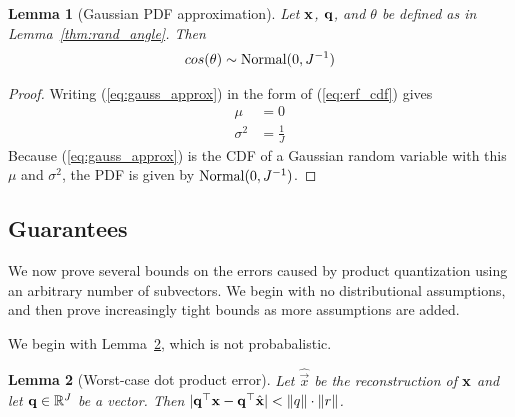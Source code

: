 \documentclass[]{article}
\newtheorem{lemma}{Lemma}[section]
\newtheorem{corollary}{Corrolary}[section]
\begin{document}
\begin{lemma}[Gaussian PDF approximation] \label{thm:gauss_pdf}
Let $\mathbf{x}$, $\mathbf{q}$, and $\theta$ be defined as in Lemma~\ref{thm:rand_angle}. Then
\begin{align} \label{eq:normal_approx_pdf}
    cos(\theta) \sim \operatorname{Normal}(0, J^{-1})
\end{align}
\end{lemma}

\begin{proof} Writing (\ref{eq:gauss_approx}) in the form of (\ref{eq:erf_cdf}) gives
\begin{align}
    \mu &= 0 \\
    \sigma^2 &= \frac{1}{J}
\end{align}
Because (\ref{eq:gauss_approx}) is the CDF of a Gaussian random variable with this $\mu$ and $\sigma^2$, the PDF is given by $\operatorname{Normal}(0, J^{-1})$.
\end{proof}


\subsection{Guarantees}%

We now prove several bounds on the errors caused by product quantization using an arbitrary number of subvectors. We begin with no distributional assumptions, and then prove increasingly tight bounds as more assumptions are added.

We begin with Lemma~\ref{thm:worst_dotprod}, which is not probabalistic.


\begin{lemma}[Worst-case dot product error] \label{thm:worst_dotprod}
Let $\hat{\vec{x}}$ be the reconstruction of $\mathbf{x}$ and let $\mathbf{q} \in \mathbb{R}^J$ be a vector. Then $\lvert\mathbf{q}^\top \mathbf{x} - \mathbf{q}^\top \hat{\mathbf{x}}\rvert < \lVert q\rVert \cdot \lVert r\rVert$.
\end{lemma}
\end{document}
